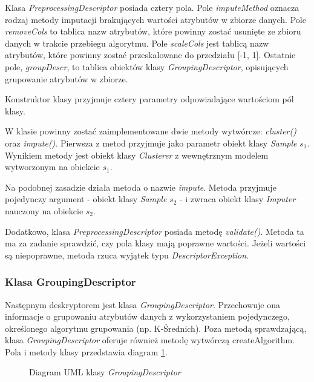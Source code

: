 \documentclass[../thesis.tex]{subfiles}
\begin{document}
Klasa \emph{PreprocessingDescriptor} posiada cztery pola. Pole \emph{imputeMethod} oznacza rodzaj metody imputacji brakujących wartości atrybutów w zbiorze danych. Pole \emph{removeCols} to tablica nazw atrybutów, które powinny zostać usunięte ze zbioru danych w trakcie przebiegu algorytmu. Pole \emph{scaleCols} jest tablicą nazw atrybutów, które powinny zostać przeskalowane do przedziału [-1, 1]. Ostatnie pole, \emph{groupDescr}, to tablica obiektów klasy \emph{GroupingDescriptor}, opisujących grupowanie atrybutów w zbiorze.

Konstruktor klasy przyjmuje cztery parametry odpowiadające wartościom pól klasy.

W klasie powinny zostać zaimplementowane dwie metody wytwórcze: \emph{cluster()} oraz \emph{impute()}. Pierwsza z metod przyjmuje jako parametr obiekt klasy \emph{Sample} $s_1$. Wynikiem metody jest obiekt klasy \emph{Clusterer} z wewnętrznym modelem wytworzonym na obiekcie $s_1$. 

Na podobnej zasadzie działa metoda o nazwie \emph{impute}. Metoda przyjmuje pojedynczy argument - obiekt klasy \emph{Sample} $s_2$ - i zwraca obiekt klasy \emph{Imputer} nauczony na obiekcie $s_2$.

Dodatkowo, klasa \emph{PreprocessingDescriptor} posiada metodę \emph{validate()}. Metoda ta ma za zadanie sprawdzić, czy pola klasy mają poprawne wartości. Jeżeli wartości są niepoprawne, metoda rzuca wyjątek typu \emph{DescriptorException}.

\subsubsection{Klasa GroupingDescriptor}

Następnym deskryptorem jest klasa \emph{GroupingDescriptor}. Przechowuje ona informacje o grupowaniu atrybutów danych z wykorzystaniem pojedynczego, określonego algorytmu grupowania (np. K-Średnich). Poza metodą sprawdzającą, klasa \emph{GroupingDescriptor} oferuje również metodę wytwórczą createAlgorithm. Pola i metody klasy przedstawia diagram \ref{proj:diagram_grouping_descriptor}.

\begin{figure}[h]
\centering
{}
\caption{Diagram UML klasy \emph{GroupingDescriptor}}
\label{proj:diagram_grouping_descriptor}
\end{figure}
\end{document}
